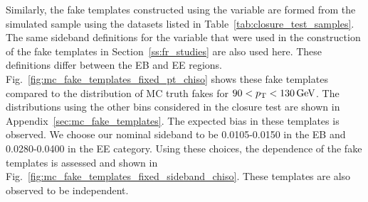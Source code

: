 Similarly, the fake templates constructed using the \chiso variable are formed from the simulated sample using the datasets listed in Table~\ref{tab:closure_test_samples}. The same sideband definitions for the \sieie variable that were used in the construction of the fake templates in Section~\ref{ss:fr_studies} are also used here. These definitions differ between the EB and EE regions. Fig.~\ref{fig:mc_fake_templates_fixed_pt_chiso} shows these fake templates compared to the distribution of MC truth fakes for $90 < p_{\mathrm{T}} < 130\,\text{Ge\hspace{-.08em}V}$. The distributions using the other \pt bins considered in the closure test are shown in Appendix~\ref{sec:mc_fake_templates}. The expected bias in these templates is observed. We choose our nominal \sieie sideband to be 0.0105-0.0150 in the EB and 0.0280-0.0400 in the EE category. Using these choices, the \pt dependence of the \chiso fake templates is assessed and shown in Fig.~\ref{fig:mc_fake_templates_fixed_sideband_chiso}. These templates are also observed to be \pt independent.

